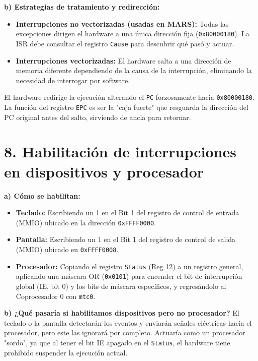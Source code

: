 \documentclass[12pt,a4paper]{article}
\begin{document}
\textbf{b) Estrategias de tratamiento y redirección:}
\begin{itemize}
    \item \textbf{Interrupciones no vectorizadas (usadas en MARS):} Todas las excepciones dirigen el hardware a una única dirección fija (\texttt{0x80000180}). La ISR debe consultar el registro \texttt{Cause} para descubrir qué pasó y actuar.
    \item \textbf{Interrupciones vectorizadas:} El hardware salta a una dirección de memoria diferente dependiendo de la causa de la interrupción, eliminando la necesidad de interrogar por software.
\end{itemize}
El hardware redirige la ejecución alterando el \texttt{PC} forzosamente hacia \texttt{0x80000180}. La función del registro \texttt{EPC} es ser la "caja fuerte" que resguarda la dirección del PC original antes del salto, sirviendo de ancla para retornar.

\section*{8. Habilitación de interrupciones en dispositivos y procesador}
\textbf{a) Cómo se habilitan:}
\begin{itemize}
    \item \textbf{Teclado:} Escribiendo un 1 en el Bit 1 del registro de control de entrada (MMIO) ubicado en la dirección \texttt{0xFFFF0000}.
    \item \textbf{Pantalla:} Escribiendo un 1 en el Bit 1 del registro de control de salida (MMIO) ubicado en \texttt{0xFFFF0008}.
    \item \textbf{Procesador:} Copiando el registro \texttt{Status} (Reg 12) a un registro general, aplicando una máscara OR (\texttt{0x0101}) para encender el bit de interrupción global (IE, bit 0) y los bits de máscara específicos, y regresándolo al Coprocesador 0 con \texttt{mtc0}.
\end{itemize}
\textbf{b) ¿Qué pasaría si habilitamos dispositivos pero no procesador?}
El teclado o la pantalla detectarán los eventos y enviarán señales eléctricas hacia el procesador, pero este las ignorará por completo. Actuaría como un procesador "sordo", ya que al tener el bit IE apagado en el \texttt{Status}, el hardware tiene prohibido suspender la ejecución actual.
\end{document}

